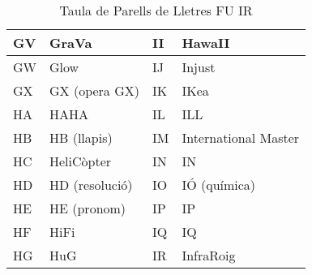\begin{table}[h]
\begin{tabular}{l|l|l|l}
    GV & GraVa          & II & HawaII               \\\hline
    GW & Glow           & IJ & Injust               \\\hline
    GX & GX (opera GX)  & IK & IKea                 \\\hline
    HA & HAHA           & IL & ILL                  \\\hline
    HB & HB (llapis)    & IM & International Master \\\hline
    HC & HeliCòpter     & IN & IN                   \\\hline
    HD & HD (resolució) & IO & IÓ (química)         \\\hline
    HE & HE (pronom)    & IP & IP                   \\\hline
    HF & HiFi           & IQ & IQ                   \\\hline
    HG & HuG            & IR & InfraRoig            \\\hline
    \end{tabular}
    \caption{Taula de Parells de Lletres FU \rightarrow IR}
    \label{tla:lletres-3}
    \end{table}


